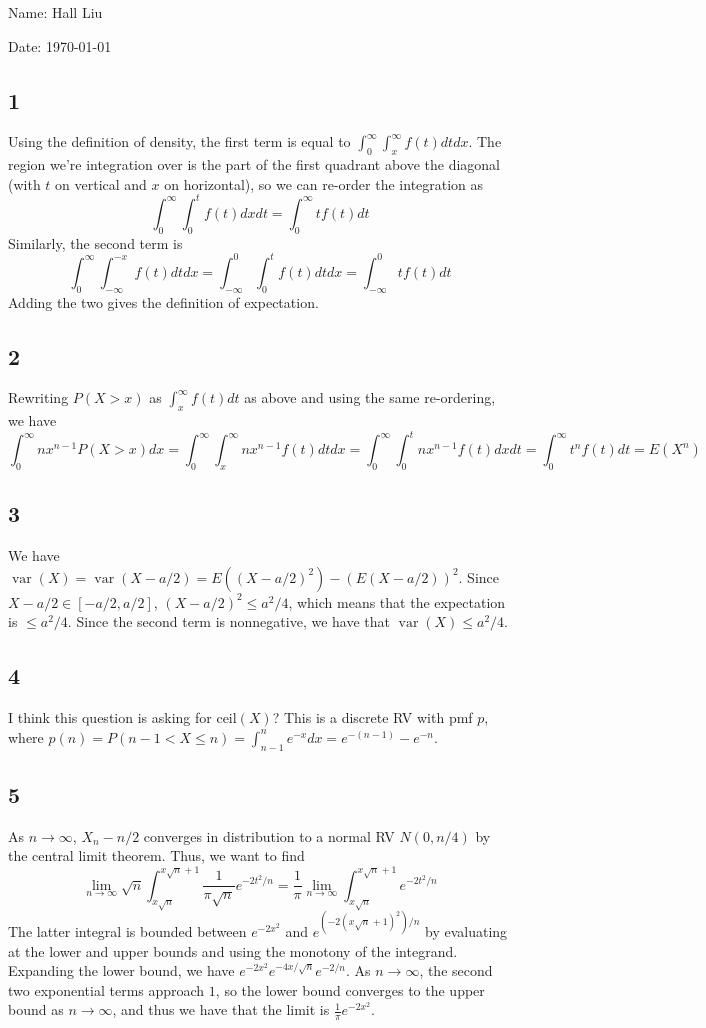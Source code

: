 \documentclass{article}
\DeclareMathOperator{\var}{var}
\begin{document}
Name: Hall Liu

Date: \today 
\vspace{1.5cm}

\subsection*{1}
Using the definition of density, the first term is equal to $\int_0^\infty\int_x^\infty f(t)dtdx$. The region we're integration over is the part of the first quadrant above the diagonal (with $t$ on vertical and $x$ on horizontal), so we can re-order the integration as
$$\int_0^\infty\int_0^tf(t)dxdt=\int_0^\infty tf(t)dt$$
Similarly, the second term is 
$$\int_0^\infty\int_{-\infty}^{-x}f(t)dtdx=\int_{-\infty}^0\int_0^tf(t)dtdx=\int_{-\infty}^0tf(t)dt$$
Adding the two gives the definition of expectation.
\subsection*{2}
Rewriting $P(X>x)$ as $\int_x^\infty f(t)dt$ as above and using the same re-ordering, we have
$$\int_0^\infty nx^{n-1}P(X>x)dx=\int_0^\infty\int_x^\infty nx^{n-1}f(t)dtdx=\int_0^\infty\int_0^tnx^{n-1}f(t)dxdt=\int_0^\infty t^nf(t)dt=E(X^n)$$
\subsection*{3}
We have $\var(X)=\var(X-a/2)=E((X-a/2)^2)-(E(X-a/2))^2$. Since $X-a/2\in[-a/2,a/2]$, $(X-a/2)^2\leq a^2/4$, which means that the expectation is $\leq a^2/4$. Since the second term is nonnegative, we have that $\var(X)\leq a^2/4$.
\subsection*{4}
I think this question is asking for $\text{ceil}(X)$? This is a discrete RV with pmf $p$, where $p(n)=P(n-1<X\leq n)=\int_{n-1}^ne^{-x}dx=e^{-(n-1)}-e^{-n}$.
\subsection*{5}
As $n\to\infty$, $X_n-n/2$ converges in distribution to a normal RV $N(0,n/4)$ by the central limit theorem. Thus, we want to find 
$$\lim_{n\to\infty}\sqrt{n}\int_{x\sqrt{n}}^{x\sqrt{n}+1}\frac{1}{\pi\sqrt{n}}e^{-2t^2/n}=\frac{1}{\pi}\lim_{n\to\infty}\int_{x\sqrt{n}}^{x\sqrt{n}+1}e^{-2t^2/n}$$
The latter integral is bounded between $e^{-2x^2}$ and $e^{(-2(x\sqrt{n}+1)^2)/n}$ by evaluating at the lower and upper bounds and using the monotony of the integrand. Expanding the lower bound, we have $e^{-2x^2}e^{-4x/\sqrt{n}}e^{-2/n}$. As $n\to\infty$, the second two exponential terms approach $1$, so the lower bound converges to the upper bound as $n\to\infty$, and thus we have that the limit is $\frac{1}{\pi}e^{-2x^2}$.
\end{document}
